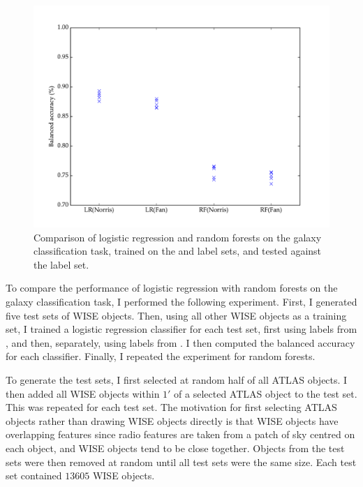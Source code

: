   \begin{figure}[!ht]
    \centering
    \includegraphics[width=\textwidth]{images/experiments/lr_rf}
    \caption{Comparison of logistic regression and random forests on the galaxy
      classification task, trained on the \citet{norris06} and \citet{fan15}
      label sets, and tested against the \citet{norris06} label set.}
  \end{figure}

  To compare the performance of logistic regression with random forests on the
  galaxy classification task, I performed the following experiment. First, I
  generated five test sets of WISE objects. Then, using all other WISE objects
  as a training set, I trained a logistic regression classifier for each test
  set, first using labels from \citet{norris06}, and then, separately, using
  labels from \citet{fan15}. I then computed the balanced accuracy for each
  classifier. Finally, I repeated the experiment for random forests.

  To generate the test sets, I first selected at random half of all ATLAS
  objects. I then added all WISE objects within $1'$ of a selected ATLAS object
  to the test set. This was repeated for each test set. The motivation for first
  selecting ATLAS objects rather than drawing WISE objects directly is that WISE
  objects have overlapping features since radio features are taken from a patch
  of sky centred on each object, and WISE objects tend to be close together.
  Objects from the test sets were then removed at random until all test sets
  were the same size. Each test set contained $13605$ WISE objects.

